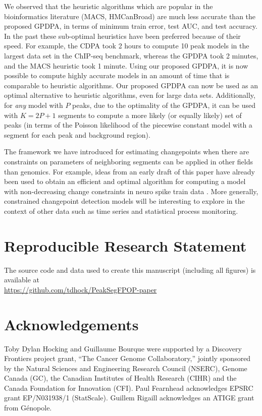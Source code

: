 \documentclass[twoside,11pt]{article}
\begin{document}
We observed that the heuristic algorithms which are popular in the
bioinformatics literature (MACS, HMCanBroad) are much less accurate
than the proposed GPDPA, in terms of minimum train error, test AUC, and
test accuracy. In the past these sub-optimal heuristics have been
preferred because of their speed. For example, the CDPA took 2 hours
to compute 10 peak models in the largest data set in the ChIP-seq
benchmark, whereas the GPDPA took 2 minutes, and the MACS heuristic
took 1 minute. Using our proposed GPDPA, it is now possible to compute
highly accurate models in an amount of time that is comparable to
heuristic algorithms. Our proposed GPDPA can now be used as an optimal
alternative to heuristic algorithms, even for large data
sets. Additionally, for \emph{any} model with $P$ peaks, due to the optimality of the GPDPA, it can be used 
with $K=2P+1$ segments to compute a more likely (or
equally likely) set of peaks (in terms of the Poisson likelihood of
the piecewise constant model with a segment for each peak and
background region).

The framework we have introduced for estimating changepoints when
there are constraints on parameters of neighboring segments can be
applied in other fields than genomics. For example, ideas from an
early draft of this paper
\citep{Hocking-constrained-changepoint-detection} have already been
used to obtain an efficient and optimal algorithm for computing a model with non-decreasing change constraints in
neuro spike train data \citep{Jewell2018}. More generally, constrained
changepoint detection models will be interesting to explore in the
context of other data such as time series and statistical process
monitoring.
 
\section{Reproducible Research Statement}

The source code and data used to create this manuscript (including all
figures) is available at\\
\url{https://github.com/tdhock/PeakSegFPOP-paper}


\section{Acknowledgements}
  
Toby Dylan Hocking and Guillaume Bourque were supported by a Discovery
Frontiers project grant, ``The Cancer Genome Collaboratory,'' jointly
sponsored by the Natural Sciences and Engineering Research Council
(NSERC), Genome Canada (GC), the Canadian Institutes of Health
Research (CIHR) and the Canada Foundation for Innovation (CFI). Paul
Fearnhead acknowledges EPSRC grant EP/N031938/1 (StatScale).
Guillem Rigaill acknowledges an ATIGE  grant from G\'enopole.
\end{document}
